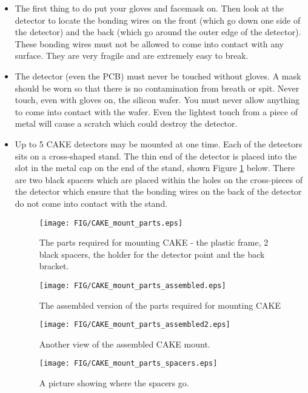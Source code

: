 \documentclass[11pt]{report}
\begin{document}
\begin{itemize}

\item The first thing to do put your gloves and facemask on. Then look at the detector to locate the bonding wires on the front (which go down one side of the detector) and the back (which go around the outer edge of the detector). These bonding wires must not be allowed to come into contact with any surface. They are very fragile and are extremely easy to break.

\item The detector (even the PCB) must never be touched without gloves. A mask should be worn so that there is no contamination from breath or spit. Never touch, even with gloves on, the silicon wafer. You must never allow anything to come into contact with the wafer. Even the lightest touch from a piece of metal will cause a scratch which could destroy the detector.

\item Up to 5 CAKE detectors may be mounted at one time. Each of the detectors sits on a cross-shaped stand. The thin end of the detector is placed into the slot in the metal cap on the end of the stand, shown Figure \ref{fig:CAKE_mounting_stuff} below. There are two black spacers which are placed within the holes on the cross-pieces of the detector which ensure that the bonding wires on the back of the detector do not come into contact with the stand.

\begin{figure}
 \texttt{[image: FIG/CAKE\_mount\_parts.eps]}
 \caption{The parts required for mounting CAKE - the plastic frame, 2 black spacers, the holder for the detector point and the back bracket.}
 \label{fig:CAKE_mounting_stuff}
\end{figure}

\begin{figure}
 \texttt{[image: FIG/CAKE\_mount\_parts\_assembled.eps]}
 \caption{The assembled version of the parts required for mounting CAKE}
 \label{fig:CAKE_mounting_stuff_assembled}
\end{figure}

\begin{figure}
 \texttt{[image: FIG/CAKE\_mount\_parts\_assembled2.eps]}
 \caption{Another view of the assembled CAKE mount.}
 \label{fig:CAKE_mounting_stuff_assembled}
\end{figure}

\begin{figure}
 \texttt{[image: FIG/CAKE\_mount\_parts\_spacers.eps]}
 \caption{A picture showing where the spacers go.}
 \label{fig:CAKE_spacers}
\end{figure}




\end{itemize}
\end{document}
